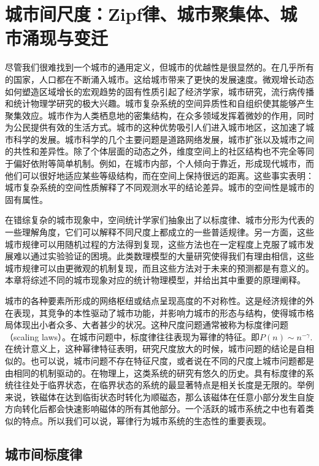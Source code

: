 \chapter{城市间尺度：Zipf律、城市聚集体、城市涌现与变迁}

尽管我们很难找到一个城市的通用定义，但城市的优越性是很显然的。在几乎所有的国家，人口都在不断涌入城市。这给城市带来了更快的发展速度。微观增长动态如何塑造区域增长的宏观趋势的固有性质引起了经济学家，城市研究，流行病传播和统计物理学研究的极大兴趣。城市复杂系统的空间异质性和自组织使其能够产生聚集效应\cite{Keuschnigg13759}。城市作为人类栖息地的密集结构，在众多领域发挥着微妙的作用，同时为公民提供有效的生活方式。城市的这种优势吸引人们进入城市地区，这加速了城市科学的发展。城市科学的几个主要问题是道路网络发展，城市扩张以及城市之间的共性和差异性。除了个体层面的动态之外，维度空间上的社区结构也不完全等同于偏好依附等简单机制。例如，在城市内部，个人倾向于靠近，形成现代城市，而他们可以很好地适应某些等级结构，而在空间上保持很远的距离。这些事实表明：城市复杂系统的空间性质解释了不同观测水平的结论差异。城市的空间性是城市的固有属性。

在错综复杂的城市现象中，空间统计学家们抽象出了以标度律、城市分形为代表的一些理解角度，它们可以解释不同尺度上都成立的一些普适规律。另一方面，这些城市规律可以用随机过程的方法得到复现，这些方法也在一定程度上克服了城市发展难以通过实验验证的困境。此类数理模型的大量研究使得我们有理由相信，这些城市规律可以由更微观的机制复现，而且这些方法对于未来的预测都是有意义的。本章将综述不同的城市现象对应的统计物理模型，并给出其中重要的原理阐释。


城市的各种要素所形成的网络枢纽或结点呈现高度的不对称性。这是经济规律的外在表现\cite{BerryThe}，其竞争的本性驱动了城市功能，并影响力城市的形态与结构，使得城市格局体现出小者众多、大者甚少的状况。这种尺度问题通常被称为标度律问题（scaling laws）。在城市问题中，标度律往往表现为幂律的特征。即$P(n)\sim n^{-\gamma}$. 在统计意义上，这种幂律特征表明，研究尺度放大的时候，城市问题的结论是自相似的。也可以说，城市问题不存在特征尺度，或者说在不同的尺度上城市问题都是由相同的机制驱动的。在物理上，这类系统的研究有悠久的历史。具有标度律的系统往往处于临界状态，在临界状态的系统的最显著特点是相关长度是无限的。举例来说，铁磁体在达到临街状态时转化为顺磁态，那么该磁体在任意小部分发生自旋方向转化后都会快速影响磁体的所有其他部分。一个活跃的城市系统之中也有着类似的特点。所以我们可以说，幂律行为城市系统的生态性的重要表现。

\section{城市间标度律}

